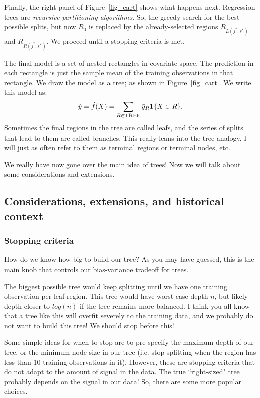 Finally, the right panel of Figure~\ref{fig_cart} shows what happens next. Regression trees are \emph{recursive partitioning algorithms}. So, the greedy search for the best possible splits, but now $R_0$ is replaced by the already-selected regions $R_{L(j^*,s^*)}$ and $R_{R(j^*,s^*)}$. We proceed until a stopping criteria is met.

The final model is a set of nested rectangles in covariate space. The prediction in each rectangle is just the sample mean of the training observations in that rectangle. We draw the model as a tree; as shown in Figure~\ref{fig_cart}. We write this model as:
$$
\hat{y} = \hat{f}(X) = \sum_{R \in \mathrm{TREE}} \bar{y}_R \bold{1}\{X \in R\}. 
$$
Sometimes the final regions in the tree are called leafs, and the series of splits that lead to them are called branches. This really leans into the tree analogy. I will just as often refer to them as terminal regions or terminal nodes, etc. 

We really have now gone over the main idea of trees! Now we will talk about some considerations and extensions. 

\subsection{Considerations, extensions, and historical context}

\subsubsection{Stopping criteria}

How do we know how big to build our tree? As you may have guessed, this is the main knob that controls our bias-variance tradeoff for trees. 

The biggest possible tree would keep splitting until we have one training observation per leaf region. This tree would have worst-case depth $n$, but likely depth closer to $log(n)$ if the tree remains more balanced. I think you all know that a tree like this will overfit severely to the training data, and we probably do not want to build this tree! We should stop before this! 

Some simple ideas for when to stop are to pre-specify the maximum depth of our tree, or the minimum node size in our tree (i.e. stop splitting when the region has less than 10 training observations in it). However, these are stopping criteria that do not adapt to the amount of signal in the data. The true ``right-sized" tree probably depends on the signal in our data! So, there are some more popular choices. 

